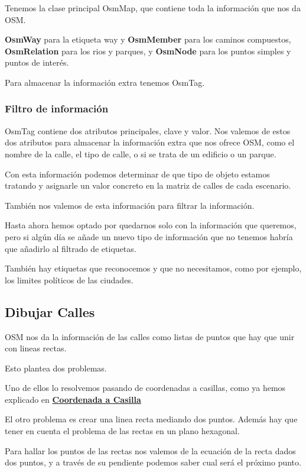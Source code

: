 Tenemos la clase principal OsmMap, que contiene toda la información que nos da
OSM.

{\bf OsmWay} para la etiqueta way y {\bf OsmMember} para los caminos
compuestos, {\bf OsmRelation} para los rios y parques, y {\bf OsmNode} para los
puntos simples y puntos de interés. 

Para almacenar la información extra tenemos OsmTag.
\subsubsection*{Filtro de información}
OsmTag contiene dos atributos principales, clave y valor. Nos valemos de estos
dos atributos para almacenar la información extra que nos ofrece OSM, como el
nombre de la calle, el tipo de calle, o si se trata de un edificio o un parque.

Con esta información podemos determinar de que tipo de objeto estamos tratando
y asignarle un valor concreto en la matriz de calles de cada escenario.

También nos valemos de esta información para filtrar la información.

Hasta ahora hemos optado por quedarnos solo con la información que queremos,
pero si algún día se añade un nuevo tipo de información que no tenemos habría
que añadirlo al filtrado de etiquetas.

También hay etiquetas que reconocemos y que no necesitamos, como por ejemplo,
los limites políticos de las ciudades.

\subsection*{Dibujar Calles}
OSM nos da la información de las calles como listas de puntos que hay que unir
con lineas rectas.

Esto plantea dos problemas.

Uno de ellos lo resolvemos pasando de coordenadas a casillas, como ya hemos
explicado en \hyperref[coordToCasilla]{\bf Coordenada a Casilla}

El otro problema es crear una linea recta mediando dos puntos.
Además hay que tener en cuenta el problema de las rectas en un plano hexagonal.

Para hallar los puntos de las rectas nos valemos de la ecuación de la recta
dados dos puntos, y a través de su pendiente podemos saber cual será el próximo
punto.

